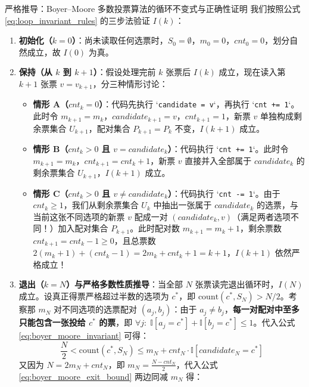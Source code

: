 \documentclass[a4paper]{article}
\begin{document}
\begin{knowledgebox}{严格推导：Boyer--Moore 多数投票算法的循环不变式与正确性证明}
我们按照公式 \eqref{eq:loop_invariant_rules} 的三步法验证 $I(k)$：
\begin{enumerate}
    \item \textbf{初始化（$k = 0$）}：尚未读取任何选票时，$S_0 = \emptyset$，$m_0 = 0$，$\mathit{cnt}_0 = 0$，划分自然成立，故 $I(0)$ 为真。
    \item \textbf{保持（从 $k$ 到 $k+1$）}：假设处理完前 $k$ 张票后 $I(k)$ 成立，现在读入第 $k+1$ 张票 $v = v_{k+1}$，分三种情形讨论：
    \begin{itemize}
        \item \textbf{情形 A（$\mathit{cnt}_k = 0$）}：代码先执行 `\texttt{candidate = v}`，再执行 `\texttt{cnt += 1}`。此时令 $m_{k+1} = m_k$，$\mathit{candidate}_{k+1} = v$，$\mathit{cnt}_{k+1} = 1$，新票 $v$ 单独构成剩余票集合 $U_{k+1}$，配对集合 $P_{k+1} = P_k$ 不变，$I(k+1)$ 成立。
        \item \textbf{情形 B（$\mathit{cnt}_k > 0$ 且 $v = \mathit{candidate}_k$）}：代码执行 `\texttt{cnt += 1}`。此时令 $m_{k+1} = m_k$，$\mathit{cnt}_{k+1} = \mathit{cnt}_k + 1$，新票 $v$ 直接并入全部属于 $\mathit{candidate}_k$ 的剩余票集合 $U_{k+1}$，$I(k+1)$ 成立。
        \item \textbf{情形 C（$\mathit{cnt}_k > 0$ 且 $v \neq \mathit{candidate}_k$）}：代码执行 `\texttt{cnt -= 1}`。由于 $\mathit{cnt}_k \ge 1$，我们从剩余票集合 $U_k$ 中抽出一张属于 $\mathit{candidate}_k$ 的选票，与当前这张不同选项的新票 $v$ 配成一对 $(\mathit{candidate}_k, v)$（满足两者选项不同！）加入配对集合 $P_{k+1}$。此时配对数 $m_{k+1} = m_k + 1$，剩余票数 $\mathit{cnt}_{k+1} = \mathit{cnt}_k - 1 \ge 0$，且总票数 $2(m_k + 1) + (\mathit{cnt}_k - 1) = 2m_k + \mathit{cnt}_k + 1 = k + 1$，$I(k+1)$ 依然严格成立！
    \end{itemize}
    \item \textbf{退出（$k = N$）与严格多数性质推导}：当全部 $N$ 张票读完退出循环时，$I(N)$ 成立。设真正得票严格超过半数的选项为 $c^*$，即 $\mathrm{count}(c^*, S_N) > N / 2$。考察那 $m_N$ 对不同选项的选票配对 $(a_j, b_j)$：由于 $a_j \neq b_j$，\textbf{每一对配对中至多只能包含一张投给 $c^*$ 的票}，即 $\forall j:\; \mathbb{I}[a_j = c^*] + \mathbb{I}[b_j = c^*] \le 1$。代入公式 \eqref{eq:boyer_moore_invariant} 可得：
    \begin{equation}
    \frac{N}{2} < \mathrm{count}(c^*, S_N) \le m_N + \mathit{cnt}_N \cdot \mathbb{I}[\mathit{candidate}_N = c^*]
    \label{eq:boyer_moore_exit_bound}
    \end{equation}
    又因为 $N = 2m_N + \mathit{cnt}_N$，即 $m_N = \frac{N - \mathit{cnt}_N}{2}$，代入公式 \eqref{eq:boyer_moore_exit_bound} 两边同减 $m_N$ 得：

\end{enumerate}
\end{knowledgebox}
\end{document}
